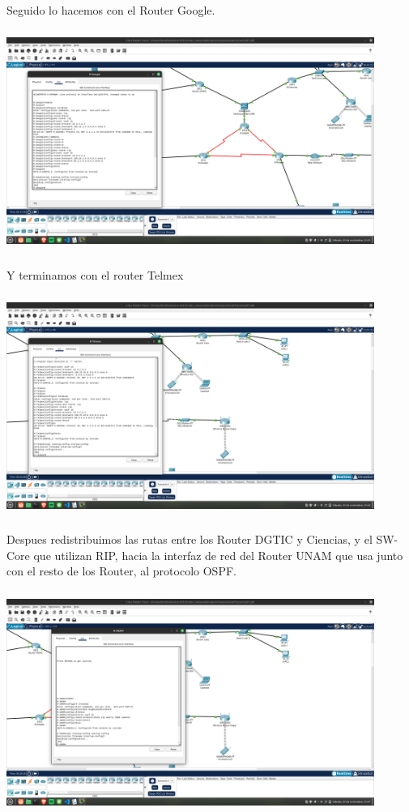 \documentclass[14pt]{book}
\begin{document}
Seguido lo hacemos con el Router Google.\\
 
\includegraphics[width=12cm, height=8cm]{images/general google.png}\\

Y terminamos con el router Telmex\\

\includegraphics[width=12cm, height=8cm]{images/general telmex.png}\\

Despues redistribuimos las rutas entre los Router DGTIC y Ciencias, y el SW-Core que utilizan RIP, hacia la interfaz de red del Router
UNAM que usa junto con el resto de los Router, al protocolo OSPF.\\

\includegraphics[width=12cm, height=8cm]{images/redistro unam.png}\\
\end{document}
